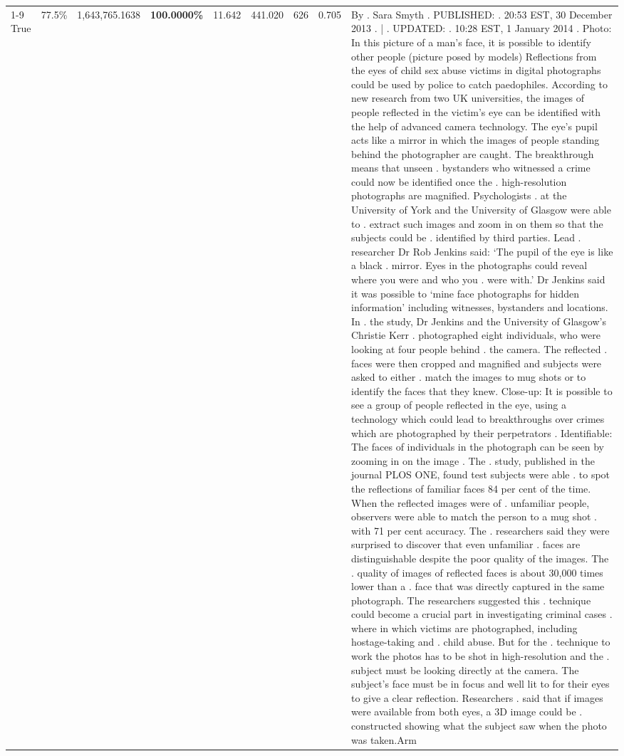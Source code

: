 \begin{table}[H]
\begin{tabular}{lllrlllll}
\cline{1-9}
True & 77.5\% & 1,643,765.1638 & \bfseries \color{red} 100.0000\% & 11.642 & 441.020 & 626 & 0.705 & By . Sara Smyth . PUBLISHED: . 20:53 EST, 30 December 2013 . | . UPDATED: . 10:28 EST, 1 January 2014 . Photo: In this picture of a man's face, it is possible to identify other people (picture posed by models) Reflections from the eyes of child sex abuse victims in digital photographs could be used by police to catch paedophiles. According to new research from two UK universities, the images of people reflected in the victim's eye can be identified with the help of advanced camera technology. The eye's pupil acts like a mirror in which the images of people standing behind the photographer are caught. The breakthrough means that unseen . bystanders who witnessed a crime could now be identified once the . high-resolution photographs are magnified. Psychologists . at the University of York and the University of Glasgow were able to . extract such images and zoom in on them so that the subjects could be . identified by third parties. Lead . researcher Dr Rob Jenkins said: ‘The pupil of the eye is like a black . mirror. Eyes in the photographs could reveal where you were and who you . were with.' Dr Jenkins said it was possible to ‘mine face photographs for hidden information' including witnesses, bystanders and locations. In . the study, Dr Jenkins and the University of Glasgow's Christie Kerr . photographed eight individuals, who were looking at four people behind . the camera. The reflected . faces were then cropped and magnified and subjects were asked to either . match the images to mug shots or to identify the faces that they knew. Close-up: It is possible to see a group of people reflected in the eye, using a technology which could lead to breakthroughs over crimes which are photographed by their perpetrators . Identifiable: The faces of individuals in the photograph can be seen by zooming in on the image . The . study, published in the journal PLOS ONE, found test subjects were able . to spot the reflections of familiar faces 84 per cent of the time. When the reflected images were of . unfamiliar people, observers were able to match the person to a mug shot . with 71 per cent accuracy. The . researchers said they were surprised to discover that even unfamiliar . faces are distinguishable despite the poor quality of the images. The . quality of images of reflected faces is about 30,000 times lower than a . face that was directly captured in the same photograph. The researchers suggested this . technique could become a crucial part in investigating criminal cases . where in which victims are photographed, including hostage-taking and . child abuse. But for the . technique to work the photos has to be shot in high-resolution and the . subject must be looking directly at the camera. The subject's face must be in focus and well lit to for their eyes to give a clear reflection. Researchers . said that if images were available from both eyes, a 3D image could be . constructed showing what the subject saw when the photo was taken.Arm \\

\end{tabular}
\end{table}

